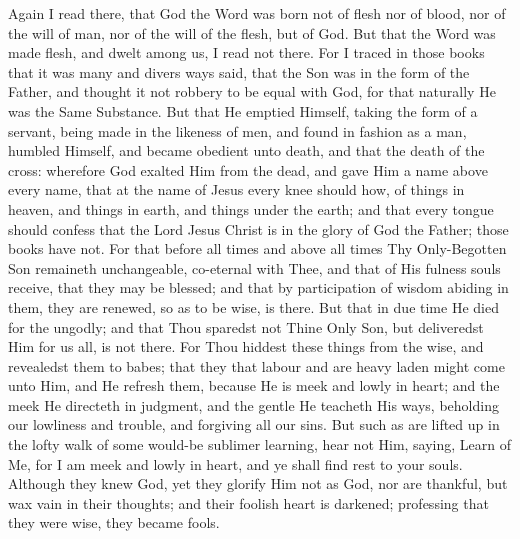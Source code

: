 \documentclass[b5paper,openright,12pt,twoside]{book}
\begin{document}
Again I read there, that God the Word was born not of flesh nor of
blood, nor of the will of man, nor of the will of the flesh, but of God.
But that the Word was made flesh, and dwelt among us, I read not there.
For I traced in those books that it was many and divers ways said, that
the Son was in the form of the Father, and thought it not robbery to be
equal with God, for that naturally He was the Same Substance. But that
He emptied Himself, taking the form of a servant, being made in the
likeness of men, and found in fashion as a man, humbled Himself, and
became obedient unto death, and that the death of the cross: wherefore
God exalted Him from the dead, and gave Him a name above every name,
that at the name of Jesus every knee should how, of things in heaven,
and things in earth, and things under the earth; and that every tongue
should confess that the Lord Jesus Christ is in the glory of God the
Father; those books have not. For that before all times and above all
times Thy Only-Begotten Son remaineth unchangeable, co-eternal with
Thee, and that of His fulness souls receive, that they may be blessed;
and that by participation of wisdom abiding in them, they are renewed,
so as to be wise, is there. But that in due time He died for the
ungodly; and that Thou sparedst not Thine Only Son, but deliveredst Him
for us all, is not there. For Thou hiddest these things from the wise,
and revealedst them to babes; that they that labour and are heavy laden
might come unto Him, and He refresh them, because He is meek and lowly
in heart; and the meek He directeth in judgment, and the gentle He
teacheth His ways, beholding our lowliness and trouble, and forgiving
all our sins. But such as are lifted up in the lofty walk of some
would-be sublimer learning, hear not Him, saying, Learn of Me, for I am
meek and lowly in heart, and ye shall find rest to your souls. Although
they knew God, yet they glorify Him not as God, nor are thankful,
but wax vain in their thoughts; and their foolish heart is darkened;
professing that they were wise, they became fools.
\end{document}
